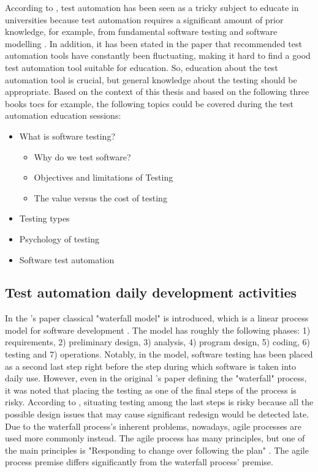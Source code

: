 According to \citeauthor{timoney2008experiences}, test automation has been seen as a tricky subject to educate in universities because test automation requires a significant amount of prior knowledge, for example, from fundamental software testing and software modelling \cite{timoney2008experiences}. In addition, it has been stated in the paper that recommended test automation tools have constantly been fluctuating, making it hard to find a good test automation tool suitable for education. So, education about the test automation tool is crucial, but general knowledge about the testing should be appropriate. Based on the context of this thesis and based on the following three books \cite{ammann2016introduction, everett2007software, singh2012software} \glspl{toc} for example, the following topics could be covered during the test automation education sessions:
\begin{itemize}[noitemsep]
	\item What is software testing?
	\begin{itemize}[noitemsep]
		\item Why do we test software?
		\item Objectives and limitations of Testing
		\item The value versus the cost of testing
	\end{itemize}
	\item Testing types
	\item Psychology of testing
	\item Software test automation
\end{itemize}

\subsection{Test automation daily development activities}\label{subsection:test_automation_daily_activities}
In the \citeauthor{royce1987managing}'s paper classical "waterfall model" is introduced, which is a linear process model for software development \cite{royce1987managing}. The model has roughly the following phases: 1) requirements, 2) preliminary design, 3) analysis, 4) program design, 5) coding, 6) testing and 7) operations. Notably, in the model, software testing has been placed as a second last step right before the step during which software is taken into daily use. However, even in the original \citeauthor{royce1987managing}'s paper defining the "waterfall" process, it was noted that placing the testing as one of the final steps of the process is risky. According to \citeauthor{royce1987managing}, situating testing among the last steps is risky because all the possible design issues that may cause significant redesign would be detected late. Due to the waterfall process's inherent problems, nowadays, agile processes are used more commonly instead. The agile process has many principles, but one of the main principles is "Responding to change over following the plan" \cite{beck2001agile}. The agile process premise differs significantly from the waterfall process' premise.

